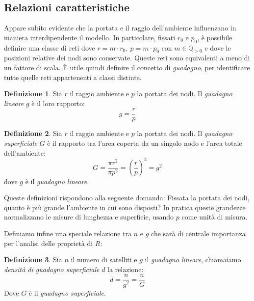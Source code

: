 \documentclass[a4paper,12pt]{article}
\theoremstyle{definition}
\newtheorem{definition}{Definizione}
\begin{document}
\subsection{Relazioni caratteristiche}

Appare subito evidente che la portata e il raggio dell'ambiente influenzano in maniera interdipendente il modello. In particolare, fissati $r_0$ e $p_0$, è possibile definire una classe di reti dove $r = m \cdot r_0, \ p = m \cdot p_0$ con $m \in \mathbb{Q}_{>0}$ e dove le posizioni relative dei nodi sono conservate. Queste reti sono equivalenti a meno di un fattore di scala. È utile quindi definire il concetto di \emph{guadagno}, per identificare tutte quelle reti appartenenti a classi distinte.

\begin{definition}
Sia $r$ il raggio ambiente e $p$ la portata dei nodi. Il \emph{guadagno lineare} $g$ è il loro rapporto:
\begin{displaymath}
g = \frac{r}{p}
\end{displaymath}
\end{definition}

\begin{definition}
Sia $r$ il raggio ambiente e $p$ la portata dei nodi. Il \emph{guadagno superficiale} $G$ è il rapporto tra l'area coperta da un singolo nodo e l'area totale dell'ambiente:
\begin{displaymath}
G = \frac{\pi r^2}{\pi p^2} = \left(\frac{r}{p}\right)^2 = g^2
\end{displaymath}
dove $g$ è il \emph{guadagno lineare}.
\end{definition}

Queste definizioni rispondono alla seguente domanda: Fissata la portata dei nodi, quanto è più grande l'ambiente in cui sono disposti? In pratica queste grandezze normalizzano le misure di lunghezza e superficie, usando $p$ come unità di misura.

Definiamo infine una speciale relazione tra $n$ e $g$ che sarà di centrale importanza per l'analisi delle proprietà di $R$:

\begin{definition}
Sia $n$ il numero di satelliti e $g$ il \emph{guadagno lineare}, chiamaiamo \emph{densità di guadagno superficiale} $d$ la relazione:
\begin{displaymath}
d = \frac{n}{g^2} = \frac{n}{G}
\end{displaymath}
Dove $G$ è il \emph{guadagno superficiale}.
\end{definition}
\end{document}
